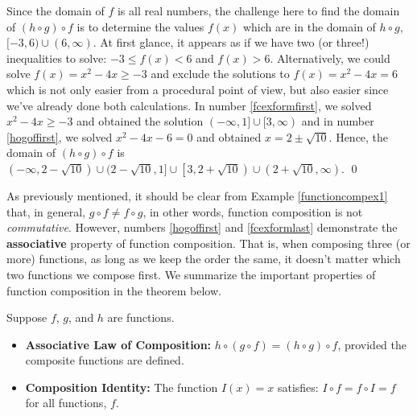 \begin{ex}
\begin{enumerate}
\begin{itemize}
 \end{itemize}

 
Since the domain of $f$ is all real numbers, the challenge here to find the domain of $(h \circ g) \circ f$ is to determine the values $f(x)$ which are in the domain of  $h \circ g$,  $[-3, 6) \cup (6, \infty)$.  At first glance, it appears as if we have two (or three!) inequalities to solve:  $-3 \leq f(x) < 6$ and $f(x) > 6$.  Alternatively, we could solve $f(x) = x^2-4x \geq -3$ and exclude the solutions to $f(x) = x^2-4x = 6$ which is not only easier from a procedural point of view, but also easier since we've already done both calculations.   In number \ref{fcexformfirst}, we solved  $x^2-4x \geq -3$ and obtained the solution $(-\infty, 1] \cup [3, \infty)$ and in number \ref{hogoffirst}, we solved $x^2-4x-6 = 0$ and obtained $x = 2 \pm \sqrt{10}$.  Hence, the domain of $(h \circ g) \circ f$ is  $(-\infty, 2 -\sqrt{10}) \cup (2 - \sqrt{10}, 1] \cup \left[3, 2 + \sqrt{10}\right) \cup \left(2+\sqrt{10}, \infty\right)$. \qed

\end{enumerate}

\label{functioncompex1}
\end{ex}

As previously mentioned, it should be clear from  Example \ref{functioncompex1} that, in general, $g \circ f \neq f \circ g$, in other words, function composition is not \textit{commutative}.  However, numbers \ref{hogoffirst} and  \ref{fcexformlast} demonstrate the  \textbf{associative} property of function composition.  That is, when composing three (or more) functions, as long as we keep the order the same, it doesn't matter which two functions we compose first.  We summarize the important properties of function composition in the theorem below.

\medskip

\colorbox{ResultColor}{\bbm
\begin{thm}\label{functioncompprops}  
Suppose $f$, $g$, and $h$ are functions.  

\begin{itemize}

\item  \textbf{Associative Law of Composition:} $h \circ (g \circ f) = (h \circ g) \circ f$, provided the composite functions are defined.

\item  \textbf{Composition Identity:}  The function $I(x) = x$ satisfies:  $ I \circ f = f \circ I =f$ for all functions, $f$.

\end{itemize}

\end{thm}
\ebm}

